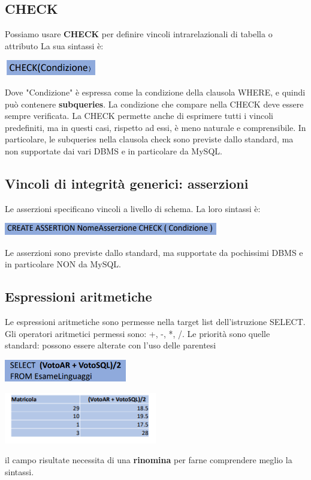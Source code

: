 \documentclass[12pt]{article}
\begin{document}
\subsection{CHECK}
Possiamo usare \textbf{CHECK} per definire vincoli intrarelazionali di tabella o attributo
La sua sintassi è:
\begin{center}
    \includegraphics[width = 0.30\textwidth]{Images/208.PNG}
\end{center}
Dove "Condizione" è espressa come la condizione della clausola WHERE, e quindi può contenere \textbf{subqueries}.
La condizione che compare nella CHECK deve essere sempre verificata.
La CHECK permette anche di esprimere tutti i vincoli predefiniti, ma in questi casi, rispetto ad essi, è meno naturale e comprensibile.
In particolare, le subqueries nella clausola check sono previste dallo standard, ma non supportate dai vari DBMS e in particolare da MySQL.
\subsection{Vincoli di integrità generici: asserzioni}
Le asserzioni specificano vincoli a livello di schema.
La loro sintassi è:
\begin{center}
    \includegraphics[width = 0.70\textwidth]{Images/209.PNG}
\end{center}
Le asserzioni sono previste dallo standard, ma supportate da pochissimi DBMS e in particolare NON da MySQL.
\subsection{Espressioni aritmetiche}
Le espressioni aritmetiche sono permesse nella target list dell'istruzione SELECT.
Gli operatori aritmetici permessi sono: +, -, *, /. \newline
Le priorità sono quelle standard: possono essere alterate con l'uso delle parentesi
\begin{center}
    \includegraphics[width = 0.40\textwidth]{Images/210.PNG}
\end{center}
\begin{center}
    \includegraphics[width = 0.50\textwidth]{Images/211.PNG}
\end{center}
il campo risultate necessita di una \textbf{rinomina} per farne comprendere meglio la sintassi.
\end{document}
